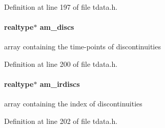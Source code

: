 Definition at line 197 of file tdata.\+h.

\hypertarget{struct_temp_data_aeb8b1beb27f1b20bda3d7de494f58c41}{}
\paragraph[{am\+\_\+discs}]{\setlength{\rightskip}{0pt plus 5cm}realtype$\ast$ am\+\_\+discs}\label{struct_temp_data_aeb8b1beb27f1b20bda3d7de494f58c41}
array containing the time-\/points of discontinuities 

Definition at line 200 of file tdata.\+h.

\hypertarget{struct_temp_data_ad64693949a923975059d0d0c49e854f9}{}
\paragraph[{am\+\_\+irdiscs}]{\setlength{\rightskip}{0pt plus 5cm}realtype$\ast$ am\+\_\+irdiscs}\label{struct_temp_data_ad64693949a923975059d0d0c49e854f9}
array containing the index of discontinuities 

Definition at line 202 of file tdata.\+h.

